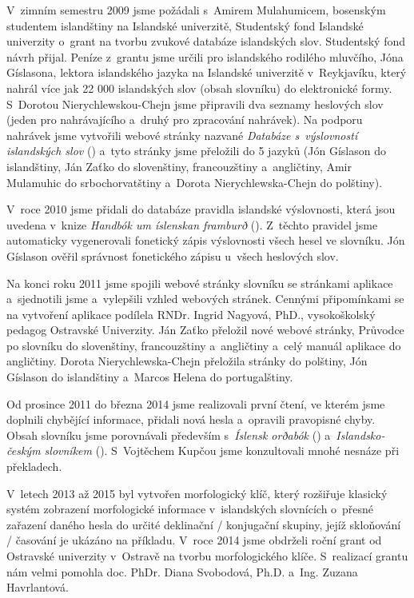 V~zimním semestru 2009 jsme požádali s~Amirem Mulahumicem, bosenským studentem islandštiny na Islandské univerzitě, Studentský fond Islandské univerzity o~grant na tvorbu zvukové databáze islandských slov. 
Studentský fond návrh přijal. Peníze z~grantu jsme určili pro islandského rodilého mluvčího, Jóna Gíslasona, lektora islandského jazyka na Islandské univerzitě v~Reykjavíku, který nahrál více jak 22 000 islandských slov (obsah slovníku) do elektronické formy. 
S~Dorotou Nierychlewskou-Chejn jsme připravili dva seznamy heslových slov (jeden pro nahrávajícího a~druhý pro zpracování nahrávek). Na podporu nahrávek jsme vytvořili webové stránky nazvané \textit{Databáze s~výslovností islandských slov} (\cite {int13}) a~tyto stránky jsme přeložili do 5 jazyků (Jón Gíslason do islandštiny, Ján Zaťko do slovenštiny, francouzštiny a~angličtiny, Amir Mulamuhic do srbochorvatštiny a~Dorota Nierychlewska-Chejn do polštiny).

V~roce 2010 jsme přidali do databáze pravidla islandské výslovnosti, která jsou uvedena v~knize \textit{Handbók um íslenskan framburð} (\cite {is2}). Z~těchto pravidel jsme automaticky vygenerovali fonetický zápis výslovnosti všech hesel ve slovníku. 
Jón Gíslason ověřil správnost fonetického zápisu u~všech heslových slov.

Na konci roku 2011 jsme spojili webové stránky slovníku se stránkami aplikace a~sjednotili jsme a~vylepšili vzhled webových stránek. Cennými připomínkami se na vytvoření aplikace podílela
RNDr. Ingrid Nagyová, PhD., vysokoškolský pedagog Ostravské Univerzity. Ján Zaťko přeložil nové webové stránky, Průvodce po slovníku do slovenštiny, francouzštiny a~angličtiny a~celý manuál aplikace do angličtiny. 
Dorota Nierychlewska-Chejn přeložila stránky do polštiny, Jón Gíslason do islandštiny a~Marcos Helena do portugalštiny.

Od prosince 2011 do března 2014 jsme realizovali první čtení, ve kterém jsme doplnili chybějící informace, přidali nová hesla a~opravili pravopisné chyby. 
Obsah slovníku jsme porovnávali především s~\textit{Íslensk orðabók}  (\cite {is}) a~\textit{Islandsko-českým slovníkem} (\cite {is7}). S~Vojtěchem Kupčou jsme konzultovali mnohé nesnáze při překladech.

V~letech 2013 až 2015 byl vytvořen morfologický klíč, který rozšiřuje klasický systém zobrazení morfologické informace v~islandských slovnících o~přesné zařazení daného hesla do určité deklinační / konjugační skupiny, jejíž
skloňování / časování je ukázáno na příkladu. V~roce 2014 jsme obdrželi roční grant od Ostravské univerzity v~Ostravě na tvorbu morfologického klíče. S~realizací grantu nám velmi pomohla doc. PhDr. Diana Svobodová, Ph.D. a~Ing. Zuzana Havrlantová.

